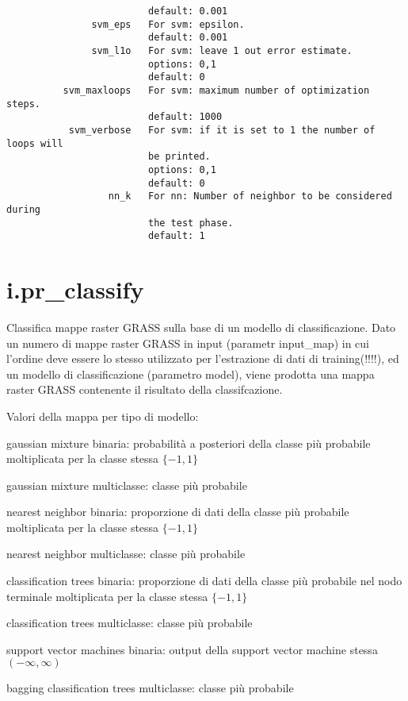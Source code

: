 \begin{verbatim}
                         default: 0.001
               svm_eps   For svm: epsilon.
                         default: 0.001
               svm_l1o   For svm: leave 1 out error estimate.
                         options: 0,1
                         default: 0
          svm_maxloops   For svm: maximum number of optimization steps.
                         default: 1000
           svm_verbose   For svm: if it is set to 1 the number of loops will
                         be printed.
                         options: 0,1
                         default: 0
                  nn_k   For nn: Number of neighbor to be considered during
                         the test phase.
                         default: 1
\end{verbatim}


\section*{i.pr\_classify}
Classifica mappe raster GRASS sulla base di un modello di
classificazione. Dato un numero di mappe raster GRASS in input
(parametr input\_map) in cui l'ordine deve essere lo stesso utilizzato
per l'estrazione di dati di training(!!!!), ed un modello di
classificazione (parametro model), viene prodotta una mappa raster
GRASS contenente il risultato della classifcazione.

Valori della mappa per tipo di modello:

\noindent
gaussian mixture binaria: probabilit\`{a} a posteriori della classe pi\`{u} probabile moltiplicata per la classe stessa $\{-1,1\}$

\noindent
gaussian mixture multiclasse: classe pi\`{u} probabile

\noindent
nearest neighbor binaria: proporzione di dati della classe pi\`{u} probabile moltiplicata per la classe stessa $\{-1,1\}$

\noindent
nearest neighbor multiclasse: classe pi\`{u} probabile

\noindent
classification trees binaria: proporzione di dati della classe pi\`{u} probabile nel nodo terminale moltiplicata per la classe stessa $\{-1,1\}$

\noindent
classification trees multiclasse: classe pi\`{u} probabile

\noindent
support vector machines binaria: output della support vector machine stessa $(-\infty,\infty)$

\noindent
bagging classification trees multiclasse: classe pi\`{u} probabile


